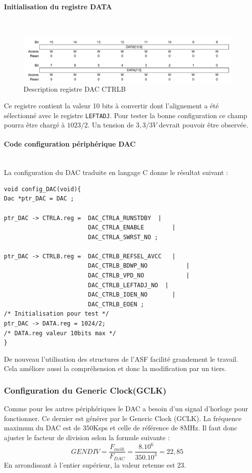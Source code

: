 \documentclass[a4paper]{article}
\begin{document}
\paragraph{Initialisation  du registre DATA} ~~\\
\begin{figure}[H]
	\centering
	\includegraphics[width=12cm]{DATA}
	\caption{Description registre DAC CTRLB}
\end{figure}
Ce registre contient la valeur 10 bits à convertir dont l'alignement a été sélectionné avec le registre \texttt{LEFTADJ}. Pour tester la bonne configuration ce champ pourra être chargé à $1023/2$. Un tension de $3,3/3V$ devrait pouvoir être observée. 

\paragraph{Code configuration périphérique DAC} ~~\\
La configuration du DAC traduite en langage C donne le résultat suivant :
\begin{lstlisting}[style=CStyle]
void config_DAC(void){
Dac *ptr_DAC = DAC ;

ptr_DAC -> CTRLA.reg = 	DAC_CTRLA_RUNSTDBY 	|
                        DAC_CTRLA_ENABLE 		|
                        DAC_CTRLA_SWRST_NO ;

ptr_DAC -> CTRLB.reg = 	DAC_CTRLB_REFSEL_AVCC	|
                        DAC_CTRLB_BDWP_NO			|
                        DAC_CTRLB_VPD_NO			|
                        DAC_CTRLB_LEFTADJ_NO  |
                        DAC_CTRLB_IOEN_NO 		|
                        DAC_CTRLB_EOEN ;
/* Initialisation pour test */
ptr_DAC -> DATA.reg = 1024/2;
/* DATA.reg valeur 10bits max */
}
\end{lstlisting}
De nouveau l'utilisation des structures de l'ASF facilité grandement le travail. Cela améliore aussi la compréhension et donc la modification par un tiers.  


\subsubsection{Configuration du Generic Clock(GCLK)}
Comme pour les autres périphériques le DAC a besoin d'un signal d'horloge pour fonctionner. Ce dernier est générer par le Generic Clock (GCLK). La fréquence maximum du DAC est de 350Ksps et celle de référence de 8MHz. Il faut donc ajuster le facteur de division selon la formule suivante :
\begin{equation}
	GENDIV = \frac{F_{mclk}}{F_{DAC}}=\frac{8.10^6}{350.10^3}=22,85
\end{equation}
En arrondissant à l'entier supérieur, la valeur retenue est 23.
\end{document}
